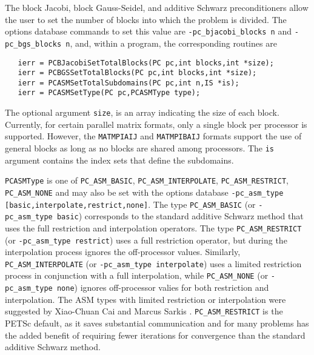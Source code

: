 The block Jacobi, block Gauss-Seidel, and additive Schwarz 
preconditioners allow the user
to set the number of blocks into which the problem is divided.  The
options database commands to set this value are {\tt -pc\_bjacobi\_blocks n}
and {\tt -pc\_bgs\_blocks n}, and, within a program, the corresponding routines
are  
  
\begin{verbatim}
   ierr = PCBJacobiSetTotalBlocks(PC pc,int blocks,int *size);
   ierr = PCBGSSetTotalBlocks(PC pc,int blocks,int *size);
   ierr = PCASMSetTotalSubdomains(PC pc,int n,IS *is);
   ierr = PCASMSetType(PC pc,PCASMType type);
\end{verbatim}
   
The 
optional argument {\tt size}, is an array indicating the size of
each block. Currently, for certain parallel matrix formats, only a
single block per processor is supported. However, the {\tt MATMPIAIJ} and 
{\tt MATMPIBAIJ} formats
support the use of general blocks as long as no blocks are shared
among processors. The {\tt is} argument contains the index sets that
define the subdomains. 

{\tt PCASMType} is one of {\tt PC\_ASM\_BASIC},
{\tt PC\_ASM\_INTERPOLATE}, {\tt PC\_ASM\_RESTRICT}, {\tt PC\_ASM\_NONE}
and may also be set with the options database {\tt -pc\_asm\_type [basic,interpolate,restrict,none]}.
   
  
The type {\tt PC\_ASM\_BASIC} (or {\tt -pc\_asm\_type basic}) corresponds to the
standard additive Schwarz method that uses the full restriction and
interpolation operators.
The type {\tt PC\_ASM\_RESTRICT} (or {\tt -pc\_asm\_type restrict}) uses a full
restriction operator, but during the interpolation process ignores the off-processor
values.
Similarly, {\tt PC\_ASM\_INTERPOLATE} (or {\tt -pc\_asm\_type interpolate}) uses a limited
restriction process in conjunction with a full interpolation, while
{\tt PC\_ASM\_NONE} (or {\tt -pc\_asm\_type none}) ignores off-processor valies
for both restriction and interpolation.
The ASM types with limited restriction or interpolation were suggested by 
Xiao-Chuan Cai and Marcus Sarkis \cite{cs97a}.    
{\tt PC\_ASM\_RESTRICT} is the PETSc default, as it saves substantial communication
and for many problems has the added benefit of requiring fewer iterations for convergence
than the standard additive Schwarz method.

